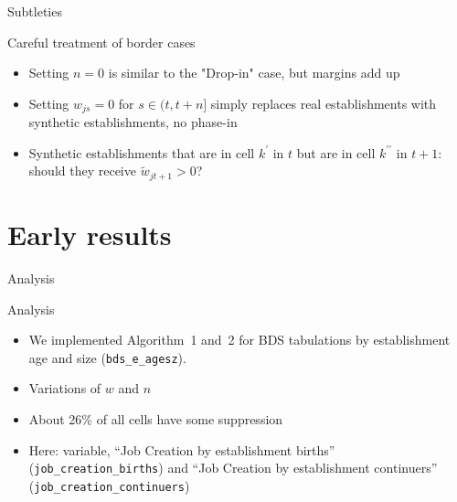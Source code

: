 \begin{frame}{Subtleties}

\begin{block}{Careful treatment of border cases}
\begin{itemize}
	\item Setting $n=0$ is similar to the "Drop-in" case, but margins add up
	\item Setting $w_{js} = 0$ for $s \in (t,t+n]$ simply replaces real establishments with synthetic establishments, no phase-in
	\item Synthetic establishments that are in cell $k^\prime$ in $t$ but are in cell $k^{\prime \prime}$ in $t+1$: should they receive $\tilde{w}_{jt+1}>0$?
\end{itemize}
\end{block}
\end{frame}



\section[Results]{Early results}


\begin{frame}{Analysis}
\begin{block}{Analysis}
\begin{itemize}[<+->]
\item We implemented Algorithm~1 and~2 for \ac{BDS} tabulations by \alert{establishment age 
and 
size} ({\tt bds\_e\_agesz}). 
\item Variations of $w$ and $n$
\item About 26\% of all cells have some suppression
\item Here: variable, ``Job Creation by establishment births'' ({\tt job\_creation\_births}) and 
``Job Creation by establishment continuers'' ({\tt job\_creation\_continuers}) 
\end{itemize}
\end{block}
\end{frame}



